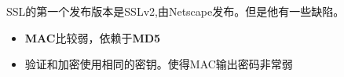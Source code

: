 \documentclass[11pt]{article}
\begin{document}
SSL的第一个发布版本是SSLv2,由Netscape发布。但是他有一些缺陷。

\begin{itemize}
 
\item{{\bf{MAC}}比较弱，依赖于{\bf{MD5}}}

\item{验证和加密使用相同的密钥。使得MAC输出密码非常弱}



\end{itemize}


%
%
% 
%
\end{document}
